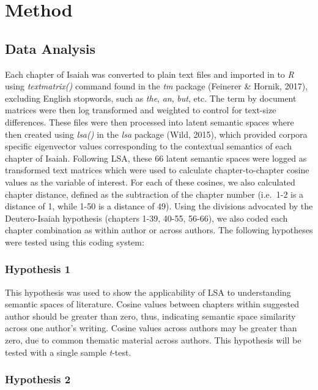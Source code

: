 \documentclass[english,man]{apa6}
\newcounter{author}
\theoremstyle{definition}
\theoremstyle{definition}
\theoremstyle{definition}
\theoremstyle{remark}
\begin{document}
\section{Method}\label{method}

\subsection{Data Analysis}\label{data-analysis}

Each chapter of Isaiah was converted to plain text files and imported in
to \emph{R} using \emph{textmatrix()} command found in the \emph{tm}
package (Feinerer \& Hornik, 2017), excluding English stopwords, such as
\emph{the}, \emph{an}, \emph{but}, etc. The term by document matrices
were then log transformed and weighted to control for text-size
differences. These files were then processed into latent semantic spaces
where then created using \emph{lsa()} in the \emph{lsa} package (Wild,
2015), which provided corpora specific eigenvector values corresponding
to the contextual semantics of each chapter of Isaiah. Following LSA,
these 66 latent semantic spaces were logged as transformed text matrices
which were used to calculate chapter-to-chapter cosine values as the
variable of interest. For each of these cosines, we also calculated
chapter distance, defined as the subtraction of the chapter number
(i.e.~1-2 is a distance of 1, while 1-50 is a distance of 49). Using the
divisions advocated by the Deutero-Isaiah hypothesis (chapters 1-39,
40-55, 56-66), we also coded each chapter combination as within author
or across authors. The following hypotheses were tested using this
coding system:

\subsubsection{Hypothesis 1}\label{hypothesis-1}

This hypothesis was used to show the applicability of LSA to
understanding semantic spaces of literature. Cosine values between
chapters within suggested author should be greater than zero, thus,
indicating semantic space similarity across one author's writing. Cosine
values across authors may be greater than zero, due to common thematic
material across authors. This hypothesis will be tested with a single
sample \emph{t}-test.

\subsubsection{Hypothesis 2}\label{hypothesis-2}
\end{document}
